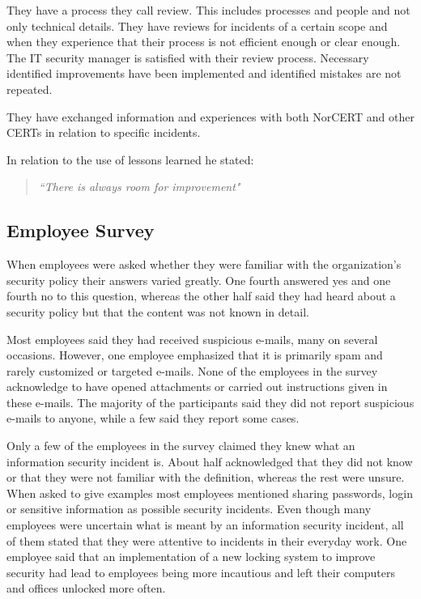 They have a process they call review. This includes processes and people and not only technical details. They have reviews for incidents of a certain scope and when they experience that their process is not efficient enough or clear enough. The IT security manager is satisfied with their review process. Necessary identified improvements have been implemented and identified mistakes are not repeated.

They have exchanged information and experiences with both \acs{NorCERT} and other \acp{CERT} in relation to specific incidents.

In relation to the use of lessons learned he stated: 

\begin{quote}
\textit{``There is always room for improvement"}
\end{quote}

\subsection{Employee Survey}
When employees were asked whether they were familiar with the organization's security policy their answers varied greatly. One fourth answered yes and one fourth no to this question, whereas the other half said they had heard about a security policy but that the content was not known in detail. 

Most employees said they had received suspicious e-mails, many on several occasions. However, one employee emphasized that it is primarily spam and rarely customized or targeted e-mails. None of the employees in the survey acknowledge to have opened attachments or carried out instructions given in these e-mails. The majority of the participants said they did not report suspicious e-mails to anyone, while a few said they report some cases.

Only a few of the employees in the survey claimed they knew what an information security incident is. About half acknowledged that they did not know or that they were not familiar with the definition, whereas the rest were unsure. When asked to give examples most employees mentioned sharing passwords, login or sensitive information as possible security incidents. Even though many employees were uncertain what is meant by an information security incident, all of them stated that they were attentive to incidents in their everyday work. One employee said that an implementation of a new locking system to improve security had lead to employees being more incautious and left their computers and offices unlocked more often.

